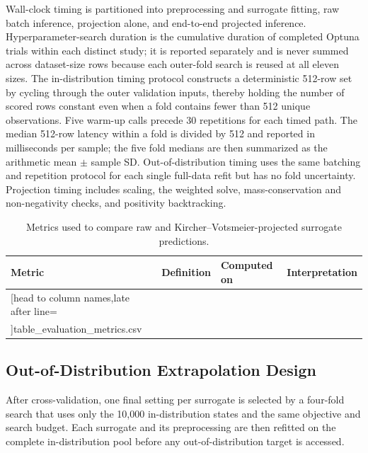 \documentclass[a4paper,fleqn]{cas-sc}
\newcommand{\csvrowsfour}[1]{%
  \csvreader[head to column names,late after line=\\]{#1}{}{\colA & \colB & \colC & \colD}}
\begin{document}
Wall-clock timing is partitioned into preprocessing and surrogate fitting, raw batch inference, projection alone, and end-to-end projected inference. Hyperparameter-search duration is the cumulative duration of completed Optuna trials within each distinct study; it is reported separately and is never summed across dataset-size rows because each outer-fold search is reused at all eleven sizes. The in-distribution timing protocol constructs a deterministic 512-row set by cycling through the outer validation inputs, thereby holding the number of scored rows constant even when a fold contains fewer than 512 unique observations. Five warm-up calls precede 30 repetitions for each timed path. The median 512-row latency within a fold is divided by 512 and reported in milliseconds per sample; the five fold medians are then summarized as the arithmetic mean $\pm$ sample SD. Out-of-distribution timing uses the same batching and repetition protocol for each single full-data refit but has no fold uncertainty. Projection timing includes scaling, the weighted solve, mass-conservation and non-negativity checks, and positivity backtracking.

\begin{table}[htbp]
\centering
\caption{Metrics used to compare raw and Kircher--Votsmeier-projected surrogate predictions.}
\label{tab:evaluation_metrics}
\scriptsize
\setlength{\tabcolsep}{3pt}
\begin{tabular}{p{2.3cm}p{3.5cm}p{2.4cm}p{2.4cm}}
\hline
Metric & Definition & Computed on & Interpretation \\
\hline
\csvrowsfour{table_evaluation_metrics.csv}
\hline
\end{tabular}
\end{table}

\subsection{Out-of-Distribution Extrapolation Design}

After cross-validation, one final setting per surrogate is selected by a four-fold search that uses only the 10,000 in-distribution states and the same objective and search budget. Each surrogate and its preprocessing are then refitted on the complete in-distribution pool before any out-of-distribution target is accessed.
\end{document}
